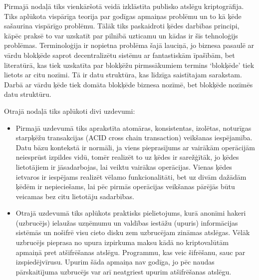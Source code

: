 Pirmajā nodaļā tiks vienkāršotā veidā izklāstīta publisko atslēgu kriptogrāfija. Tiks aplūkota vispārīga teorija par godīgas apmaiņas problēmu un to kā ķēde sašaurina vispārīgo problēmu. Tālāk tiks paskaidroti ķēdes darbības principi, kāpēc praksē to var uzskatīt par pilnībā uzticamu un kādas ir šīs tehnoloģijs problēmas. Terminoloģija ir nopietna problēma šajā lauciņā, jo biznesa pasaulē ar vārdu blokķēde saprot decentralizētu sistēmu ar fantastiskām īpašībām, bet literatūrā, kas tiek uzskatīta par blokķēžu pirmssākumiem\cite{nakamoto08} termins `blokķēde' tiek lietots ar citu nozīmi. Tā ir datu struktūra, kas līdzīga saistītajam sarakstam. Darbā ar vārdu ķēde tiek domāta blokķēde biznesa nozīmē, bet blokķēde nozīmēs datu struktūru.

Otrajā nodaļā tiks aplūkoti divi uzdevumi:
\begin{itemize}
    \item 
        Pirmajā uzdevumā tiks aprakstīta atomāras, konsistentas, izolētas, noturīgas starpķēžu transakcijas (ACID cross chain transaction) veikšanas iespējamība.\cite{back14,nolan13} Datu bāzu kontekstā ir normāli, ja viens pieprasījums ar vairākām operācijām neiesprūst izpildes vidū, tomēr realizēt to uz ķēdes ir sarežģītāk, jo ķēdes lietotājiem ir jāsadarbojas, lai veiktu vairākas operācijas. Vienas ķēdes ietvaros ir iespējams realizēt vēlamo funkcionalitāti, bet uz divām dažādām ķēdēm ir nepieciešams, lai pēc pirmās operācijas veikšanas pārējās būtu veicamas bez citu lietotāju sadarbības.
    \item
        Otrajā uzdevumā tiks aplūkots praktisks pielietojums, kurā anonīmi hakeri (uzbrucējs) ielaužas uzņēmumu un valdības iestāžu (upuris) informācijas sistēmās un nošifrē visu cieto disku zem uzbrucējam zināmas atslēgas.
        Vēlāk uzbrucējs pieprasa no upura izpirkuma maksu kādā no kriptovalūtām apmaiņā pret atšifrēšanas atslēgu. Programmu, kas veic šifrēšanu, sauc par izspiedējvīrusu.
Upurim šāda apmaiņa nav godīga, jo pēc naudas pārskaitījuma uzbrucējs var arī neatgriest upurim atšifrēšanas atslēgu. %
\end{itemize}

